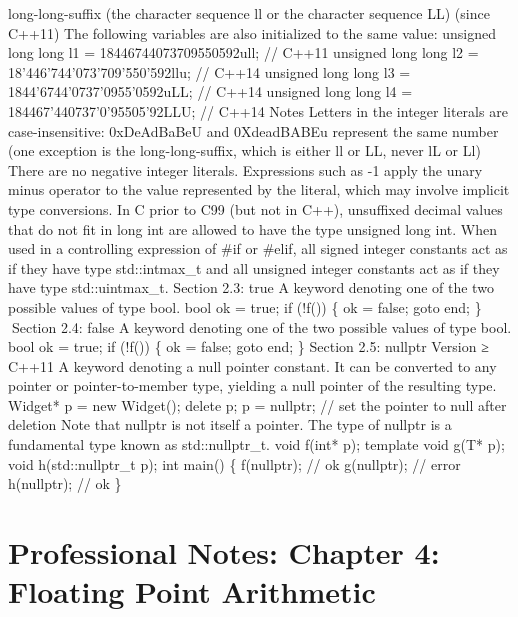 long-long-suﬃx (the character sequence ll or the character sequence LL)
(since C++11) The following variables are also initialized to the same
value: unsigned long long l1 = 18446744073709550592ull; // C++11
unsigned long long l2 = 18'446'744'073'709'550'592llu; // C++14 unsigned
long long l3 = 1844'6744'0737'0955'0592uLL; // C++14 unsigned long long
l4 = 184467'440737'0'95505'92LLU; // C++14 Notes Letters in the integer
literals are case-insensitive: 0xDeAdBaBeU and 0XdeadBABEu represent the
same number (one exception is the long-long-suﬃx, which is either ll or
LL, never lL or Ll) There are no negative integer literals. Expressions
such as -1 apply the unary minus operator to the value represented by
the literal, which may involve implicit type conversions. In C prior to
C99 (but not in C++), unsuﬃxed decimal values that do not ﬁt in long int
are allowed to have the type unsigned long int. When used in a
controlling expression of \#if or \#elif, all signed integer constants
act as if they have type std::intmax\_t and all unsigned integer
constants act as if they have type std::uintmax\_t. Section 2.3: true A
keyword denoting one of the two possible values of type bool. bool ok =
true; if (!f()) \{ ok = false; goto end; \} Section 2.4: false A
keyword denoting one of the two possible values of type bool. bool ok =
true; if (!f()) \{ ok = false; goto end; \} Section 2.5: nullptr Version
≥ C++11 A keyword denoting a null pointer constant. It can be converted
to any pointer or pointer-to-member type, yielding a null pointer of the
resulting type. Widget* p = new Widget(); delete p; p = nullptr; // set
the pointer to null after deletion Note that nullptr is not itself a
pointer. The type of nullptr is a fundamental type known as
std::nullptr\_t. void f(int* p); template void g(T* p); void
h(std::nullptr\_t p); int main() \{ f(nullptr); // ok g(nullptr); //
error h(nullptr); // ok \}

\hypertarget{professional-notes-chapter-4-floating-point-arithmetic}{%
\chapter{Professional Notes: Chapter 4: Floating Point
Arithmetic}\label{professional-notes-chapter-4-floating-point-arithmetic}}

